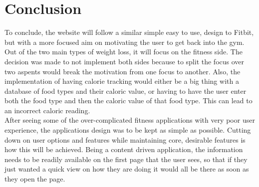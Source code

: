\section{Conclusion}
To conclude, the website will follow a similar simple easy to use, design to Fitbit, but with a more focused aim on motivating the user to get back into the gym. Out of the two main types of weight loss, it will focus on the fitness side. The decision was made to not implement both sides because to split the focus over two aspents would break the motivation from one focus to another. Also, the implementation of having calorie tracking would either be a big thing with a database of food types and their caloric value, or having to have the user enter both the food type and then the caloric value of that food type. This can lead to an incorrect caloric reading.\\

After seeing some of the over-complicated fitness applications with very poor user experience, the applications design was to be kept as simple as possible. Cutting down on user options and features while maintaining core, desirable features is how this will be achieved. Being a content driven application, the information needs to be readily available on the first page that the user sees, so that if they just wanted a quick view on how they are doing it would all be there as soon as they open the page.

